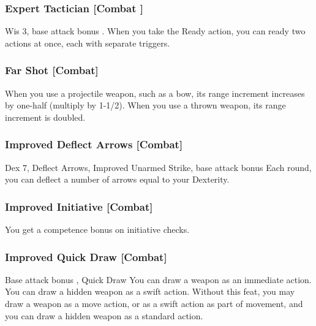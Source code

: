 \subsubsection{Expert Tactician [Combat ]}
 Wis 3, base attack bonus .
 When you take the Ready action, you can ready two actions at once, each with separate triggers.

\subsubsection{Far Shot [Combat]}
 When you use a projectile weapon, such as a bow, its range increment increases by one-half (multiply by 1-1/2). When you use a thrown weapon, its range increment is doubled.

\subsubsection{Improved Deflect Arrows [Combat]}
 Dex 7, Deflect Arrows, Improved Unarmed Strike, base attack bonus 
 Each round, you can deflect a number of arrows equal to your Dexterity.%


\subsubsection{Improved Initiative [Combat]}
 You get a  competence bonus on initiative checks.

\subsubsection{Improved Quick Draw [Combat]}
\featpres Base attack bonus , Quick Draw
\featben You can draw a weapon as an immediate action. You can draw a hidden weapon as a swift action.
 Without this feat, you may draw a weapon as a move action, or as a swift action as part of movement, and you can draw a hidden weapon as a standard action.

